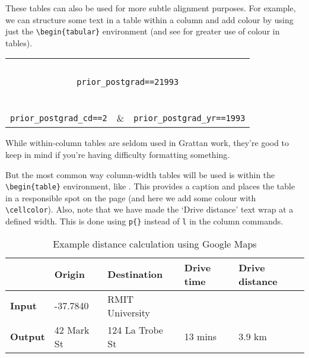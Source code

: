 These tables can also be used for more subtle alignment purposes. For example, we can structure some text in a table within a column and add colour by using just the  \texttt{\textbackslash begin\{tabular\}} environment (and see  for greater use of colour in tables).

    \begin{center} %
    \begin{tabular}{ccc} %
    
        \multicolumn{3}{c}{\cellcolor{Color5} \textcolor{white}{the variable}}  \\
        \multicolumn{3}{c}{\texttt{\small{\textcolor{Color5}{prior\_postgrad==21993}}}}  \\
        & \\ %
        \multicolumn{3}{c}{\cellcolor{Color4} \textcolor{white}{is split into}}  \\
        \texttt{\small{\textcolor{Color4}{prior\_postgrad\_cd==2}}}\quad & \& &  \texttt{\small{\textcolor{Color4}{prior\_postgrad\_yr==1993}}} \qquad \\
    \end{tabular}        
    \end{center}
    
While within-column tables are seldom used in Grattan work, they're good to keep in mind if you're having difficulty formatting something. 

But the most common way column-width tables will be used is within the \texttt{\textbackslash begin\{table\}} environment, like . This provides a caption and places the table in a responsible spot on the page (and here we add some colour with \texttt{\textbackslash cellcolor}). Also, note that we have made the `Drive distance' text wrap at a defined width. This is done using \texttt{p\{\}} instead of \texttt{l} in the column commands.

\begin{table}
    \caption{Example distance calculation using Google Maps}\label{tbl:distance} 
    \begin{tabular}{lp{1.9cm}p{2.9cm}p{1.7cm}p{1.5cm}} %
    \toprule
        & Origin & Destination & Drive time & Drive distance \\
    \toprule
        \textbf{Input} & -37.7840 & RMIT University & \cellcolor{Color1} & \cellcolor{Color1} \\
    \midrule
        \textbf{Output} & 42 Mark St & 124 La Trobe St & 13 mins & 3.9 km \\
    \bottomrule
\end{tabular}
\end{table}



